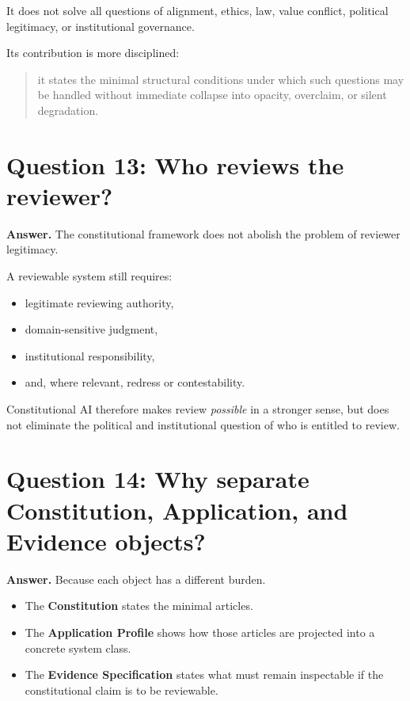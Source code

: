 \documentclass[11pt]{article}
\begin{document}
It does not solve all questions of alignment, ethics, law, value conflict, political legitimacy, or institutional governance.

Its contribution is more disciplined:
\begin{quote}
it states the minimal structural conditions under which such questions may be handled without immediate collapse into opacity, overclaim, or silent degradation.
\end{quote}

\section{Question 13: Who reviews the reviewer?}

\textbf{Answer.} The constitutional framework does not abolish the problem of reviewer legitimacy.

A reviewable system still requires:
\begin{itemize}[leftmargin=2em]
    \item legitimate reviewing authority,
    \item domain-sensitive judgment,
    \item institutional responsibility,
    \item and, where relevant, redress or contestability.
\end{itemize}

Constitutional AI therefore makes review \emph{possible} in a stronger sense, but does not eliminate the political and institutional question of who is entitled to review.

\section{Question 14: Why separate Constitution, Application, and Evidence objects?}

\textbf{Answer.} Because each object has a different burden.

\begin{itemize}[leftmargin=2em]
    \item The \textbf{Constitution} states the minimal articles.
    \item The \textbf{Application Profile} shows how those articles are projected into a concrete system class.
    \item The \textbf{Evidence Specification} states what must remain inspectable if the constitutional claim is to be reviewable.
\end{itemize}
\end{document}
